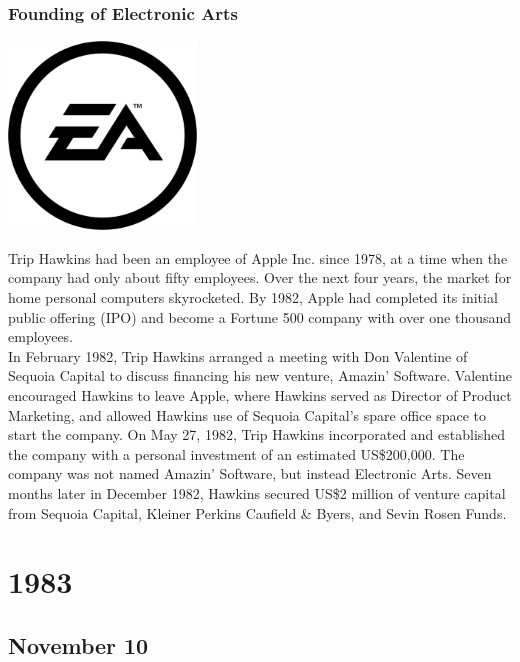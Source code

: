 \documentclass[11pt]{report}
\begin{document}
\subsection{Founding of Electronic Arts}
\vspace{2mm}\begin{center}\includegraphics[width=5cm]{./img/eaLogo.jpg}\end{center}
Trip Hawkins had been an employee of Apple Inc. since 1978, at a time when the company had only about fifty employees. Over the next four years, the market for home personal computers skyrocketed. By 1982, Apple had completed its initial public offering (IPO) and become a Fortune 500 company with over one thousand employees.\\ \indent In February 1982, Trip Hawkins arranged a meeting with Don Valentine of Sequoia Capital to discuss financing his new venture, Amazin' Software. Valentine encouraged Hawkins to leave Apple, where Hawkins served as Director of Product Marketing, and allowed Hawkins use of Sequoia Capital's spare office space to start the company. On May 27, 1982, Trip Hawkins incorporated and established the company with a personal investment of an estimated US\$200,000. The company was not named Amazin' Software, but instead Electronic Arts. Seven months later in December 1982, Hawkins secured US\$2 million of venture capital from Sequoia Capital, Kleiner Perkins Caufield \& Byers, and Sevin Rosen Funds.

\chapter{1983}
\section{November 10}
\end{document}
